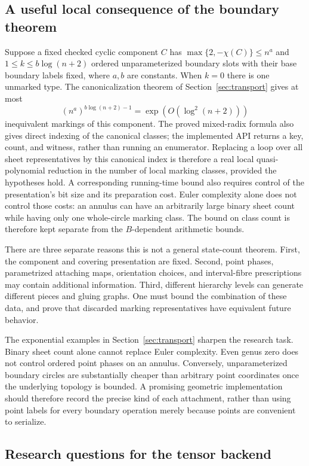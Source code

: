 \subsection{A useful local consequence of the boundary theorem}

Suppose a fixed checked cyclic component $C$ has
$\max\{2,-\chi(C)\}\le n^a$ and $1\le k\le b\log(n+2)$ ordered
unparameterized boundary slots with their base boundary labels fixed,
where $a,b$ are constants. When $k=0$ there is one unmarked type. The
canonicalization theorem of Section~\ref{sec:transport} gives at most
\[
 (n^a)^{b\log(n+2)-1}=\exp(O(\log^2(n+2)))
\]
inequivalent markings of this component. The proved mixed-radix formula
also gives direct indexing of the canonical classes; the implemented
API returns a key, count, and witness, rather than running an enumerator.
Replacing a loop over all sheet
representatives by this canonical index is therefore a real local
quasi-polynomial reduction in the number of local marking classes,
provided the hypotheses hold. A corresponding running-time bound also
requires control of the presentation's bit size and its preparation
cost. Euler complexity alone does not control those costs: an annulus
can have an arbitrarily large binary sheet count while having only one
whole-circle marking class. The bound on class count is therefore kept
separate from the $B$-dependent arithmetic bounds.

There are three separate reasons this is not a general state-count
theorem. First, the component and covering presentation are fixed.
Second, point phases, parametrized attaching maps, orientation choices,
and interval-fibre prescriptions may contain additional information.
Third, different hierarchy levels can generate different pieces and
gluing graphs. One must bound the combination of these data, and prove
that discarded marking representatives have equivalent future behavior.

The exponential examples in Section~\ref{sec:transport} sharpen the
research task. Binary sheet count alone cannot replace Euler complexity.
Even genus zero does not control ordered point phases on an annulus.
Conversely, unparameterized boundary circles are substantially cheaper
than arbitrary point coordinates once the underlying topology is bounded.
A promising geometric implementation should therefore record the precise
kind of each attachment, rather than using point labels for every
boundary operation merely because points are convenient to serialize.

\subsection{Research questions for the tensor backend}

